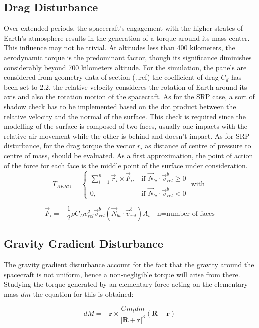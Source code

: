 \subsection{Drag Disturbance}
\label{subsec:dist_drag}

Over extended periods, the spacecraft's engagement with the higher strates of Earth's atmosphere results
in the generation of a torque around its mass center. This influence may not be trivial. At altitudes 
less than 400 kilometers, the aerodynamic torque is the predominant factor, though its significance diminishes 
considerably beyond 700 kilometers altitude. For the simulation, the panels are considered from geometry data of section (..ref)
the coefficient of drag $C_d$ has been set to $2.2$, the relative velocity consideres the rotation of Earth around its axis and also 
the rotation motion of the spacecraft. As for the SRP case, a sort of shadow check has to be implemented based on the dot product between 
the relative velocity and the normal of the surface. This check is required since the modelling of the surface is composed of two faces, usually
one impacts with the relative air movement while the other is behind and doesn't impact. As for SRP disturbance, for the drag torque the 
vector $r_i$ as distance of centre of pressure to centre of mass, should be evaluated. As a first approximation, the point of action of the 
force for each face is the middle point of the surface under consideration. 
\[
T_{AERO} =
\begin{cases}
	\sum_{i=1}^{n} \vec{r}_i \times \vec{F}_i, & \text{if } \vec{N}_{bi} \cdot \vec{v}^{b}_{rel} \geq 0 \\
	0, & \text{if } \vec{N}_{bi} \cdot \vec{v}^{b}_{rel} < 0
\end{cases}
\text{ with }
\]

\[
\vec{F}_i = -\frac{1}{2} \rho C_D v_{rel}^2 \vec{v}_{rel}^{b} (\vec{N}_{bi} \cdot \vec{v}_{rel}^{b}) A_i \quad \text{n=number of faces}
\]

\subsection{Gravity Gradient Disturbance}
\label{subsec:dist_GG}
The gravity gradient disturbance account for the fact that the gravity around the spacecraft is not uniform, hence a non-negligible torque 
will arise from there.
Studying the torque generated by an elementary force acting on the elementary mass \( dm \) the equation for this is obtained:

\begin{equation*}
	dM = -\mathbf{r} \times \frac{Gm_t dm}{|\mathbf{R} + \mathbf{r}|^3} (\mathbf{R} + \mathbf{r})
\end{equation*}

